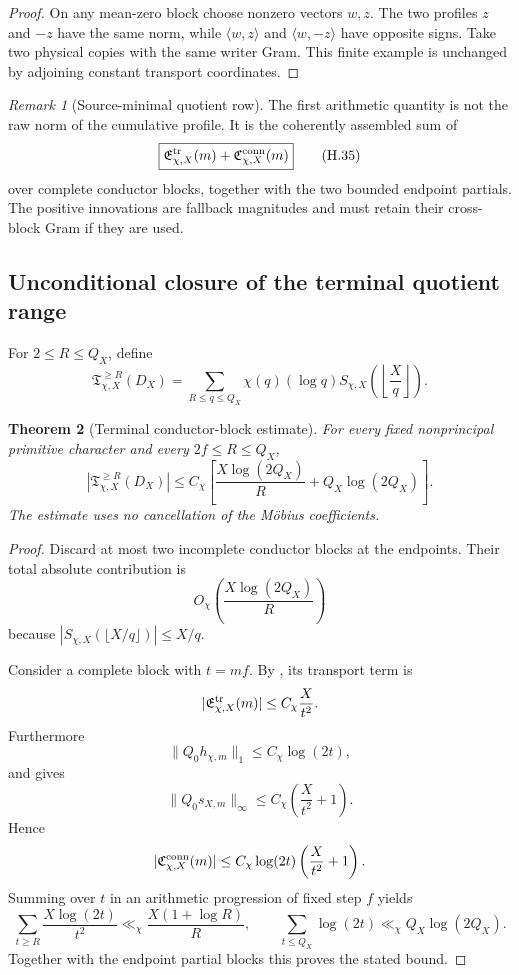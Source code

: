 \documentclass[11pt]{article}
\newtheorem{theorem}{Theorem}[section]
\theoremstyle{definition}
\theoremstyle{remark}
\newtheorem{remark}[theorem]{Remark}
\begin{document}
\begin{proof}
On any mean-zero block choose nonzero vectors \(w,z\).  The two profiles
\(z\) and \(-z\) have the same norm, while
\(\langle w,z\rangle\) and \(\langle w,-z\rangle\) have opposite signs.
Take two physical copies with the same writer Gram.  This finite example is
unchanged by adjoining constant transport coordinates.
\end{proof}

\begin{remark}[Source-minimal quotient row]
The first arithmetic quantity is not the raw norm of the cumulative profile.
It is the coherently assembled sum of
\[
 \boxed{
 \mathfrak E_{\chi,X}^{\rm tr}(m)
 +\mathfrak C_{\chi,X}^{\rm conn}(m)}
 \tag{H.35}
\]
over complete conductor blocks, together with the two bounded endpoint
partials.  The positive innovations are fallback magnitudes and must retain
their cross-block Gram if they are used.
\end{remark}

\subsection{Unconditional closure of the terminal quotient range}
\label{subsec:hyperbola-terminal-range}

For \(2\le R\le Q_X\), define
\[
 \mathfrak T_{\chi,X}^{\ge R}(D_X)
 =\sum_{R\le q\le Q_X}
  \chi(q)(\log q)
  S_{\chi,X}\!\left(\left\lfloor\frac Xq\right\rfloor\right).
 \tag{H.36}
\]

\begin{theorem}[Terminal conductor-block estimate]
\label{thm:hyperbola-terminal-estimate}
For every fixed nonprincipal primitive character and every
\(2f\le R\le Q_X\),
\[
 \boxed{
 |\mathfrak T_{\chi,X}^{\ge R}(D_X)|
 \le C_\chi\left[
  \frac{X\log(2Q_X)}{R}
  +Q_X\log(2Q_X)
 \right].}
 \tag{H.37}
\]
The estimate uses no cancellation of the M\"obius coefficients.
\end{theorem}

\begin{proof}
Discard at most two incomplete conductor blocks at the endpoints.  Their total
absolute contribution is
\[
 O_\chi\left(\frac{X\log(2Q_X)}R\right)
\]
because \(|S_{\chi,X}(\lfloor X/q\rfloor)|\le X/q\).

Consider a complete block with \(t=mf\).  By
, its transport term is
\[
 |\mathfrak E_{\chi,X}^{\rm tr}(m)|
 \le C_\chi\frac{X}{t^2}.
\]
Furthermore
\[
 \|Q_0h_{\chi,m}\|_1\le C_\chi\log(2t),
\]
and  gives
\[
 \|Q_0s_{X,m}\|_\infty
 \le C_\chi\left(\frac{X}{t^2}+1\right).
\]
Hence
\[
 |\mathfrak C_{\chi,X}^{\rm conn}(m)|
 \le C_\chi\log(2t)
      \left(\frac{X}{t^2}+1\right).
\]
Summing over \(t\) in an arithmetic progression of fixed step \(f\) yields
\[
 \sum_{t\ge R}\frac{X\log(2t)}{t^2}
 \ll_\chi\frac{X(1+\log R)}R,
 \qquad
 \sum_{t\le Q_X}\log(2t)
 \ll_\chi Q_X\log(2Q_X).
\]
Together with the endpoint partial blocks this proves the stated bound.
\end{proof}
\end{document}
